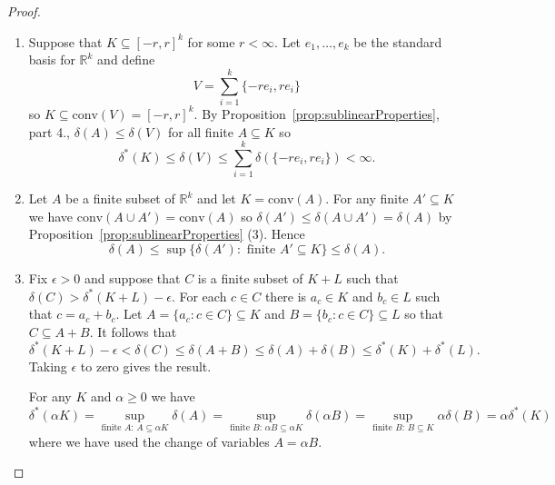 \documentclass[11pt]{article}
\newcommand{\conv}{\mathrm{conv}}
\renewcommand{\Re}{\mathbb{R}}
\begin{document}
\begin{proof}
\begin{enumerate}
\item
Suppose that $K \subseteq [-r,r]^k$ for some $r<\infty$. Let $e_1,\ldots,e_k$ be the standard basis for $\Re^k$ and define 
\[V = \sum_{i=1}^k \{-re_i,re_i\}\]
so $K \subseteq \conv(V) = [-r,r]^k$.
By Proposition~\ref{prop:sublinearProperties}, part 4., $\delta(A) \leq \delta(V)$ for all finite $A \subseteq K$ so 
\[\delta^*(K) \leq \delta(V) \leq \sum_{i=1}^k \delta(\{-re_i,re_i\}) < \infty.\] 
\item 
Let $A$ be a finite subset of $\Re^k$ and let $K = \conv(A)$. For any finite $A' \subseteq K$ we have $\conv(A \cup A') = \conv(A)$ so $\delta(A') \leq \delta(A \cup A') = \delta(A)$ by Proposition~\ref{prop:sublinearProperties} (3). 
Hence 
\[\delta(A) \leq \sup\{\delta(A'): \mbox{ finite } A' \subseteq K  \} \leq \delta(A).\]
\item 
Fix $\epsilon>0$ and suppose that $C$ is a finite subset of $K+L$ such that $\delta(C) > \delta^*(K+L) - \epsilon$. For each $c \in C$ there is $a_c \in K$ and $b_c \in L$ such that $c = a_c + b_c$. Let $A = \{a_c:c \in C\} \subseteq K$ and $B = \{b_c:c \in C\} \subseteq L$ so that $C \subseteq A+B$. It follows that 
\[\delta^*(K+L) - \epsilon < \delta(C) \leq \delta(A+B) \leq  \delta(A) + \delta(B) \leq \delta^*(K) + \delta^*(L).\]
Taking $\epsilon$ to zero gives the result. 

For any $K$ and $\alpha \geq 0$ we have
\[
\delta^*(\alpha K)= \sup_{\text{finite } A:\, A  \subseteq  \alpha K } \delta(A) = \sup_{\text{finite } B:\, \alpha B \subseteq  \alpha K } \delta(\alpha B) = \sup_{\text{finite } B:\, B \subseteq  K } \alpha \delta(B) = \alpha \delta^*(K)
\]
where we have used the change of variables $A=\alpha B$.


\end{enumerate}
\end{proof}
\end{document}
